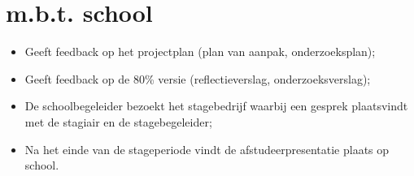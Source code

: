 \newpage
\section{m.b.t. school}
\begin{itemize}
\item Geeft feedback op het projectplan (plan van aanpak, onderzoeksplan);
\item Geeft feedback op de 80\% versie (reflectieverslag, onderzoeksverslag);
\item De schoolbegeleider bezoekt het stagebedrijf waarbij een gesprek plaatsvindt met de stagiair en de stagebegeleider;
\item Na het einde van de stageperiode vindt de afstudeerpresentatie plaats op school.
\end{itemize}